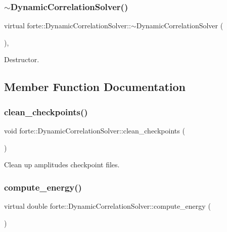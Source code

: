 \subsubsection{\texorpdfstring{$\sim$\+Dynamic\+Correlation\+Solver()}{~DynamicCorrelationSolver()}}
{\footnotesize\ttfamily virtual forte\+::\+Dynamic\+Correlation\+Solver\+::$\sim$\+Dynamic\+Correlation\+Solver (\begin{DoxyParamCaption}{ }\end{DoxyParamCaption})\hspace{0.3cm}{\ttfamily [virtual]}, {\ttfamily [default]}}



Destructor. 



\subsection{Member Function Documentation}
\mbox{\label{classforte_1_1_dynamic_correlation_solver_a6c55258f31849caa086b226937f35245}} 
\subsubsection{\texorpdfstring{clean\+\_\+checkpoints()}{clean\_checkpoints()}}
{\footnotesize\ttfamily void forte\+::\+Dynamic\+Correlation\+Solver\+::clean\+\_\+checkpoints (\begin{DoxyParamCaption}{ }\end{DoxyParamCaption})}



Clean up amplitudes checkpoint files. 

\mbox{\label{classforte_1_1_dynamic_correlation_solver_aff4c7ebdca64563939d6e3ab8a262150}} 
\subsubsection{\texorpdfstring{compute\+\_\+energy()}{compute\_energy()}}
{\footnotesize\ttfamily virtual double forte\+::\+Dynamic\+Correlation\+Solver\+::compute\+\_\+energy (\begin{DoxyParamCaption}{ }\end{DoxyParamCaption})\hspace{0.3cm}{\ttfamily [pure virtual]}}



